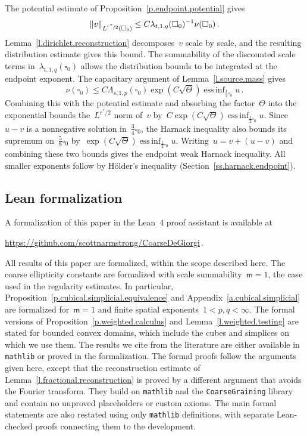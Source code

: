 \documentclass[11pt,letterpaper]{article}
\numberwithin{equation}{section}
\theoremstyle{definition}
\newcommand{\nf}{\nicefrac}
\newcommand{\cu}{\square}
\DeclareMathOperator*{\essinf}{ess\,inf}
\DeclarePairedDelimiter{\norm}{\lVert}{\rVert}
\begin{document}
The potential estimate of Proposition~\ref{p.endpoint.potential} gives
\begin{equation*}
    \norm{v}_{L^{\nf{r^*}2}(\cu_0)}
    \leq
    C\lambda_{t,1,q}(\cu_0)^{-1}\nu(\cu_0)
    \,.
\end{equation*}
Lemma~\ref{l.dirichlet.reconstruction} decomposes~$v$ scale by scale, and the resulting distribution estimate gives this bound. The summability of the discounted scale terms in~$\lambda_{t,1,q}(\cu_0)$ allows the distribution bounds to be integrated at the endpoint exponent. The capacitary argument of Lemma~\ref{l.source.mass} gives
\begin{equation*}
    \nu(\cu_0)
    \leq C\Lambda_{s,1,p}(\cu_0)
    \exp(C\sqrt\Theta)
    \essinf_{\frac12\cu_0}u
    \,.
\end{equation*}
Combining this with the potential estimate and absorbing the factor~$\Theta$ into the exponential bounds the~$L^{r^*/2}$ norm of~$v$ by~$C\exp(C\sqrt\Theta)\essinf_{\frac12\cu_0}u$. Since~$u-v$ is a nonnegative solution in~$\frac34\cu_0$, the Harnack inequality also bounds its supremum on~$\frac58\cu_0$ by~$\exp(C\sqrt\Theta)\essinf_{\frac12\cu_0}u$. Writing~$u=v+(u-v)$ and combining these two bounds gives the endpoint weak Harnack inequality. All smaller exponents follow by H\"older's inequality (Section~\ref{ss.harnack.endpoint}).

\subsection{Lean formalization}
\label{ss.lean.formalization}

A formalization of this paper in the Lean~4 proof assistant is available at
\begin{center}
\url{https://github.com/scottnarmstrong/CoarseDeGiorgi}\,.
\end{center}
All results of this paper are formalized, within the scope described here. The coarse ellipticity constants are formalized with scale summability~$\mathsf m=1$, the case used in the regularity estimates. In particular, Proposition~\ref{p.cubical.simplicial.equivalence} and Appendix~\ref{a.cubical.simplicial} are formalized for~$\mathsf m=1$ and finite spatial exponents~$1<p,q<\infty$. The formal versions of Proposition~\ref{p.weighted.calculus} and Lemma~\ref{l.weighted.testing} are stated for bounded convex domains, which include the cubes and simplices on which we use them. The results we cite from the literature are either available in \texttt{mathlib} or proved in the formalization. The formal proofs follow the arguments given here, except that the reconstruction estimate of Lemma~\ref{l.fractional.reconstruction} is proved by a different argument that avoids the Fourier transform. They build on \texttt{mathlib} and the \texttt{CoarseGraining} library and contain no unproved placeholders or custom axioms. The main formal statements are also restated using only \texttt{mathlib} definitions, with separate Lean-checked proofs connecting them to the development.
\end{document}
